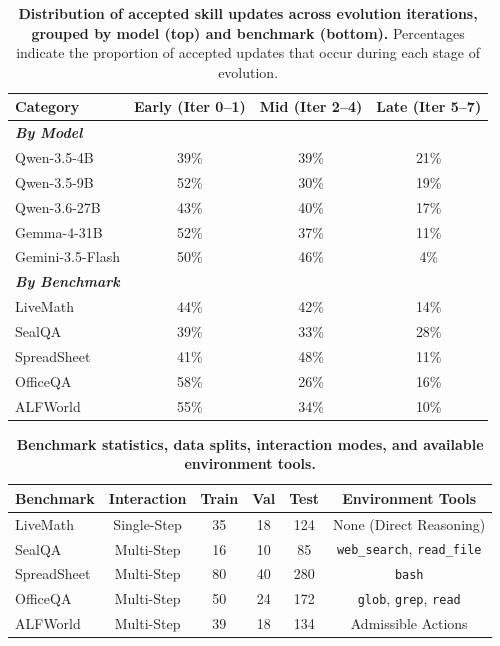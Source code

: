 \documentclass[11pt, a4paper, copyright, gr]{google}
\begin{document}
\begin{table}[t]
\centering
\small
\begin{tabular}{lccc}
\toprule
\textbf{Category} & \textbf{Early (Iter 0--1)} & \textbf{Mid (Iter 2--4)} & \textbf{Late (Iter 5--7)} \\
\midrule
\multicolumn{4}{l}{\textbf{\textit{By Model}}} \\
Qwen-3.5-4B  & 39\% & 39\% & 21\% \\
Qwen-3.5-9B  & 52\% & 30\% & 19\% \\
Qwen-3.6-27B  & 43\% & 40\% & 17\% \\
Gemma-4-31B  & 52\% & 37\% & 11\% \\
Gemini-3.5-Flash & 50\% & 46\% & 4\% \\
\midrule
\multicolumn{4}{l}{\textbf{\textit{By Benchmark}}} \\
LiveMath & 44\% & 42\% & 14\% \\
SealQA & 39\% & 33\% & 28\% \\
SpreadSheet & 41\% & 48\% & 11\% \\
OfficeQA & 58\% & 26\% & 16\% \\
ALFWorld & 55\% & 34\% & 10\% \\
\bottomrule
\end{tabular}
\caption{
\textbf{Distribution of accepted skill updates across evolution iterations, grouped by model (top) and benchmark (bottom).} Percentages indicate the proportion of accepted updates that occur during each stage of evolution.
}
\label{tab:temporal_timeline}
\vspace{-5pt}
\end{table}


\begin{table}[h]
\centering
\small
\begin{tabular}{lccccc}
\toprule
\textbf{Benchmark} & \textbf{Interaction} & \textbf{Train} & \textbf{Val} & \textbf{Test}  & \textbf{Environment Tools} \\
\midrule
LiveMath & Single-Step & 35 & 18 & 124 & None (Direct Reasoning) \\
SealQA & Multi-Step & 16 & 10 & 85 & \texttt{web\_search}, \texttt{read\_file} \\
SpreadSheet & Multi-Step & 80 & 40 & 280 & \texttt{bash} \\
OfficeQA & Multi-Step & 50 & 24 & 172 & \texttt{glob}, \texttt{grep}, \texttt{read} \\
ALFWorld & Multi-Step & 39 & 18 & 134 & Admissible Actions \\
\bottomrule
\end{tabular}
\caption{
\textbf{Benchmark statistics, data splits, interaction modes, and available environment tools.}
}
\label{tab:dataset_splits}
\end{table}
\end{document}
